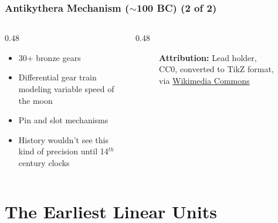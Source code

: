 \begin{frame}
    \frametitle{Antikythera Mechanism ($\sim$100 BC) (2 of 2)}

    \begin{columns}
        \begin{column}{0.48\linewidth}
            \begin{itemize}[<+- | alert@+>]
                \item 30+ bronze gears
                \item Differential gear train modeling variable speed of the moon
                \item Pin and slot mechanisms
                \item History wouldn't see this kind of precision until 14$^{th}$ century clocks
            \end{itemize}
        \end{column}
        \begin{column}{0.48\linewidth}
            \begin{figure}
                \centering
                \resizebox{0.625\linewidth}{!}{
                    
                }

                {\tiny \textbf{Attribution:} Lead holder, CC0, converted to TikZ format, via \href{https://commons.wikimedia.org/wiki/File:Antikythera_mechanism_-_labelled.svg}{Wikimedia Commons}\par}
            \end{figure}
        \end{column}
    \end{columns}
\end{frame}

\section{The Earliest Linear Units}

